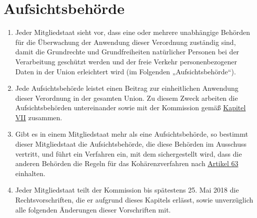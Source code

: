\chapter{Aufsichtsbehörde}
\label{ch:51}


\begin{enumerate}

  \item Jeder Mitgliedstaat sieht vor, dass eine oder mehrere unabhängige Behörden für die Überwachung der Anwendung
   dieser Verordnung zuständig sind, damit die Grundrechte und Grundfreiheiten natürlicher Personen bei der
   Verarbeitung geschützt werden und der freie Verkehr personenbezogener Daten in der Union erleichtert wird
   (im Folgenden „Aufsichtsbehörde“).
  \label{itm:51-1}

  \item Jede Aufsichtsbehörde leistet einen Beitrag zur einheitlichen Anwendung dieser Verordnung in der gesamten Union.
   Zu diesem Zweck arbeiten die Aufsichtsbehörden untereinander sowie mit der Kommission gemäß \hyperref[part:7]
   {Kapitel VII} zusammen.
  \label{itm:51-2}

  \item Gibt es in einem Mitgliedstaat mehr als eine Aufsichtsbehörde, so bestimmt dieser Mitgliedstaat die
   Aufsichtsbehörde, die diese Behörden im Ausschuss vertritt, und führt ein Verfahren ein, mit dem sichergestellt
   wird, dass die anderen Behörden die Regeln für das Kohärenzverfahren nach \hyperref[ch:63]{Artikel 63} einhalten.
  \label{itm:51-3}

  \item Jeder Mitgliedstaat teilt der Kommission bis spätestens 25. Mai 2018 die Rechtsvorschriften, die er aufgrund
   dieses Kapitels erlässt, sowie unverzüglich alle folgenden Änderungen dieser Vorschriften mit.
  \label{itm:51-4}

\end{enumerate}


